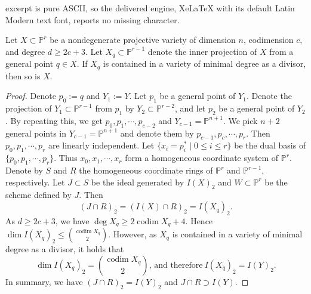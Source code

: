 \documentclass[10pt,a4paper]{amsart}
\def \codim {\operatorname{codim}}
\def \p {\mathbb{P}}
\begin{document}
excerpt is pure ASCII, so the delivered engine, XeLaTeX with its default Latin Modern text font, reports no missing character.
\begin{theorem}\label{lp_2c+3}
    Let $X\subset\p^r$ be a nondegenerate projective variety of dimension $n$, codimension $c$, and degree $d\geq 2c+3$. 
    Let $X_q\subset\p^{r-1}$ denote the inner projection of $X$ from a general point $q\in X$.
    If $X_q$ is contained in a variety of minimal degree as a divisor, then so is $X$.
\end{theorem}

\begin{proof}
    Denote $p_0:=q$ and $Y_1:=Y$.
    Let $p_1$ be a general point of $Y_1$.
    Denote the projection of $Y_1\subset\p^{r-1}$ from $p_1$ by $Y_2\subset\p^{r-2}$, and let $p_2$ be a general point of $Y_2$.
    By repeating this, we get $p_0,p_1,\cdots,p_{c-2}$ and $Y_{c-1}=\p^{n+1}$.
    We pick $n+2$ general points in $Y_{c-1}=\p^{n+1}$ and denote them by $p_{c-1},p_c,\cdots,p_r$.
    Then $p_0,p_1,\cdots,p_r$ are linearly independent.
    Let $\{x_i = p_i^* \mid 0 \leq i \leq r \}$ be the dual basis of $\{p_0,p_1,\cdots,p_r\}$.
    Thus $x_0,x_1,\cdots, x_r$ form a homogeneous coordinate system of $\p^r$.
    Denote by $S$ and $R$ the homogeneous coordinate rings of $\p^r$ and $\p^{r-1}$, respectively.
    Let $J\subset S$ be the ideal generated by $I(X)_2$ and $W\subset\p^r$ be the scheme defined by $J$.
    Then $$(J\cap R)_2=(I(X)\cap R)_2=I(X_q)_2.$$
    As $d\geq 2c+3$, we have $\deg X_q\geq 2\codim X_q+4$. 
    Hence $\dim I(X_q)_2\leq \binom{\codim X_q}{2}$. 
    However, as $X_q$ is contained in a variety of minimal degree as a divisor, it holds that 
    $$\dim I(X_q)_2=\binom{\codim X_q}{2}\text{, and therefore}~ I(X_q)_2=I(Y)_2.$$
    In summary, we have $(J\cap R)_2=I(Y)_2$ and $J\cap R\supset I(Y)$.
    

\end{proof}
\end{document}
